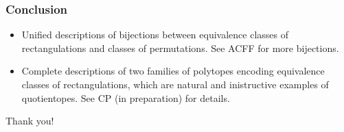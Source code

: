 \documentclass[11pt]{beamer}%
\begin{document}
\begin{frame}
  \frametitle{Conclusion}
  \begin{itemize}
  \item Unified descriptions of bijections between equivalence classes of rectangulations and classes of permutations. See ACFF for more bijections.
    \pause
    \item Complete descriptions of two families of polytopes encoding equivalence classes of rectangulations, which are natural and inistructive examples of quotientopes. See CP (in preparation) for details.
  \end{itemize}

  \pause
  \centering
             {\Huge Thank you!}\\
             
             \vspace{1cm}
             
              
\end{frame}
\end{document}
